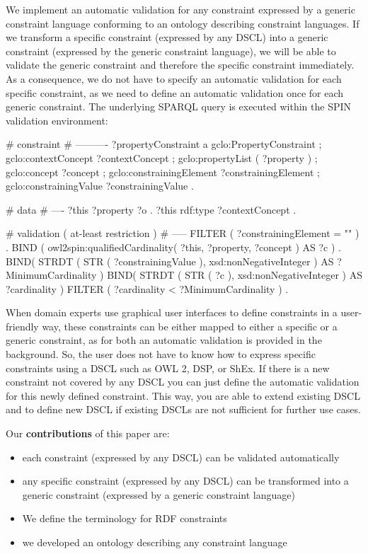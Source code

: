 \documentclass{llncs}
\begin{document}
We implement an automatic validation for any constraint expressed by a generic constraint language conforming to an ontology describing constraint languages.
If we transform a specific constraint (expressed by any DSCL) into a generic constraint (expressed by the generic constraint language), we will be able to validate the generic constraint and therefore the specific constraint immediately. 
As a consequence, we do not have to specify an automatic validation for each specific constraint, as we need to define an automatic validation once for each generic constraint. The underlying SPARQL query is executed within the SPIN validation environment:

\begin{ex}
# constraint
# ----------
?propertyConstraint
    a gclo:PropertyConstraint ;
    gclo:contextConcept ?contextConcept ;
    gclo:propertyList ( ?property ) ;
    gclo:concept ?concept ;
    gclo:constrainingElement ?constrainingElement ;
    gclo:constrainingValue ?constrainingValue .
		
# data
# ----
?this ?property ?o .
?this rdf:type ?contextConcept .

# validation ( at-least restriction )
# -----
FILTER ( ?constrainingElement = "\geq" ) .
BIND ( owl2spin:qualifiedCardinality( ?this, ?property, ?concept ) AS ?c ) .
BIND( STRDT ( STR ( ?constrainingValue ), xsd:nonNegativeInteger ) AS ?MinimumCardinality )
BIND( STRDT ( STR ( ?c ), xsd:nonNegativeInteger ) AS ?cardinality )
FILTER ( ?cardinality < ?MinimumCardinality ) .		  
\end{ex}

When domain experts use graphical user interfaces to define constraints in a user-friendly way, 
these constraints can be either mapped to either a specific or a generic constraint, as for both an automatic validation is provided in the background.    
So, the user does not have to know how to express specific constraints using a DSCL such as OWL 2, DSP, or ShEx.
If there is a new constraint not covered by any DSCL you can just define the automatic validation for this newly defined constraint.
This way, you are able to extend existing DSCL and to define new DSCL if existing DSCLs are not sufficient for further use cases.

Our \textbf{contributions} of this paper are:
\begin{itemize}
	\item each constraint (expressed by any DSCL) can be validated automatically
	\item any specific constraint (expressed by any DSCL) can be transformed into a generic constraint (expressed by a generic constraint language)
	\item We define the terminology for RDF constraints
	\item we developed an ontology describing any constraint language
\end{itemize}
\end{document}
